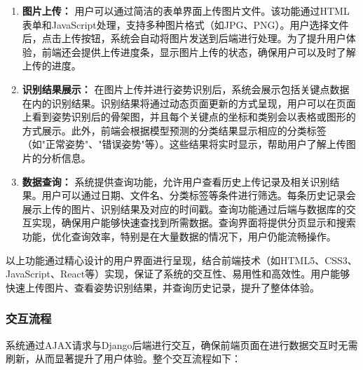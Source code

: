 \begin{enumerate}
    \item \textbf{图片上传：}
    用户可以通过简洁的表单界面上传图片文件。该功能通过HTML表单和JavaScript处理，支持多种图片格式（如JPG、PNG）。用户选择文件后，点击上传按钮，系统会自动将图片发送到后端进行处理。为了提升用户体验，前端还会提供上传进度条，显示图片上传的状态，确保用户可以及时了解上传的进度。

    \item \textbf{识别结果展示：}
    在图片上传并进行姿势识别后，系统会展示包括关键点数据在内的识别结果。识别结果将通过动态页面更新的方式呈现，用户可以在页面上看到姿势识别后的骨架图，并且每个关键点的坐标和类别会以表格或图形的方式展示。此外，前端会根据模型预测的分类结果显示相应的分类标签（如"正常姿势"、"错误姿势"等）。这些结果将实时显示，帮助用户了解上传图片的分析信息。

    \item \textbf{数据查询：}
    系统提供查询功能，允许用户查看历史上传记录及相关识别结果。用户可以通过日期、文件名、分类标签等条件进行筛选。每条历史记录会展示上传的图片、识别结果及对应的时间戳。查询功能通过后端与数据库的交互实现，确保用户能够快速查找到所需数据。查询界面将提供分页显示和搜索功能，优化查询效率，特别是在大量数据的情况下，用户仍能流畅操作。
\end{enumerate}

以上功能通过精心设计的用户界面进行呈现，结合前端技术（如HTML5、CSS3、JavaScript、React等）实现，保证了系统的交互性、易用性和高效性。用户能够快速上传图片、查看姿势识别结果，并查询历史记录，提升了整体体验。


\subsubsection{交互流程}

系统通过AJAX请求与Django后端进行交互，确保前端页面在进行数据交互时无需刷新，从而显著提升了用户体验。整个交互流程如下：

